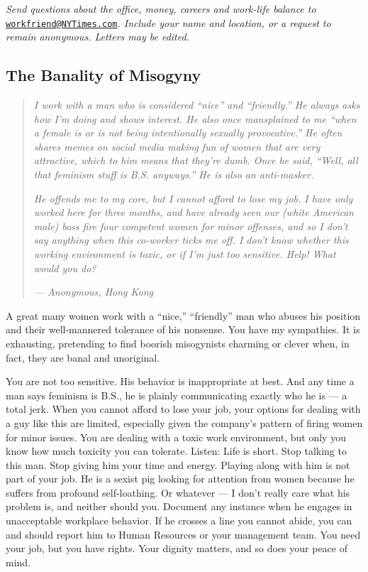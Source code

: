 \emph{Send questions about the office, money, careers and work-life
balance to}
\href{mailto:workfriend@NYTimes.com}{\nolinkurl{workfriend@NYTimes.com}}\emph{.
Include your name and location, or a request to remain anonymous.
Letters may be edited.}

\hypertarget{the-banality-of-misogyny}{%
\subsection{The Banality of Misogyny}\label{the-banality-of-misogyny}}

\begin{quote}
\emph{I work with a man who is considered ``nice'' and ``friendly.'' He
always asks how I'm doing and shows interest. He also once mansplained
to me ``when a female is or is not being intentionally sexually
provocative.'' He often shares memes on social media making fun of women
that are very attractive, which to him means that they're dumb. Once he
said, ``Well, all that feminism stuff is B.S. anyways.'' He is also an
anti-masker.}

\emph{He offends me to my core, but I cannot afford to lose my job. I
have only worked here for three months, and have already seen our (white
American male) boss fire four competent women for minor offenses, and so
I don't say anything when this co-worker ticks me off. I don't know
whether this working environment is toxic, or if I'm just too sensitive.
Help! What would you do?}

\emph{--- Anonymous, Hong Kong}
\end{quote}

A great many women work with a ``nice,'' ``friendly'' man who abuses his
position and their well-mannered tolerance of his nonsense. You have my
sympathies. It is exhausting, pretending to find boorish misogynists
charming or clever when, in fact, they are banal and unoriginal.

You are not too sensitive. His behavior is inappropriate at best. And
any time a man says feminism is B.S., he is plainly communicating
exactly who he is --- a total jerk. When you cannot afford to lose your
job, your options for dealing with a guy like this are limited,
especially given the company's pattern of firing women for minor issues.
You are dealing with a toxic work environment, but only you know how
much toxicity you can tolerate. Listen: Life is short. Stop talking to
this man. Stop giving him your time and energy. Playing along with him
is not part of your job. He is a sexist pig looking for attention from
women because he suffers from profound self-loathing. Or whatever --- I
don't really care what his problem is, and neither should you. Document
any instance when he engages in unacceptable workplace behavior. If he
crosses a line you cannot abide, you can and should report him to Human
Resources or your management team. You need your job, but you have
rights. Your dignity matters, and so does your peace of mind.

